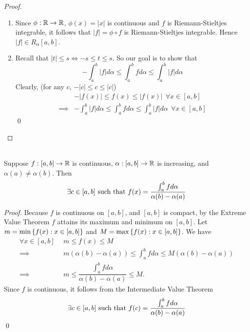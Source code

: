 \begin{proof}
    \begin{enumerate}
        \item Since $\phi: \mathbb{R} \to \mathbb{R}$, $\phi(x) = |x|$ is continuous and $f$ is Riemann-Stieltjes integrable, it follows that $|f| = \phi \circ f$ is Riemann-Stieltjes integrable. Hence $|f| \in R_\alpha[a,b]$.
        \item Recall that $|t| \leq s \iff -s \leq t \leq s$. So our goal is to show that 
        $$-\int_a^b |f| d\alpha \leq \int_a^b f d \alpha \leq \int_a^b |f| d\alpha$$
        Clearly, (for any $c$, $-|c| \leq c \leq |c|$)
        \begin{align*}
            &-|f(x)| \leq f(x) \leq |f(x)|~~ \forall x \in [a,b] \\
            \implies& -\int_a^b |f| d\alpha \leq \int_a^b f d\alpha \leq \int_a^b |f| d\alpha ~~\forall x \in [a,b]
        \end{align*}
        \qed
    \end{enumerate}
\end{proof}

\begin{theorem} \leavevmode \\
    \label{Thm6.14}
    Suppose $f: [a,b] \to \mathbb{R}$ is continuous, $\alpha: [a,b] \to \mathbb{R}$ is increasing, and $\alpha(a) \neq \alpha(b)$. Then
    $$\exists c \in [a,b] \text{ such that } f(x) = \dfrac{\int_a^bf d\alpha}{\alpha(b) - \alpha(a)}$$
\end{theorem}

\begin{proof}
    Because $f$ is continuous on $[a,b]$, and $[a,b]$ is compact, by the Extreme Value Theorem $f$ attains its maximum and minimum on $[a,b]$. Let $m = \min\left\{f(x) : x \in [a,b]\right\}$ and $M = \max \left\{f(x) : x \in [a,b]\right\}$. We have
    \begin{align*}
        \forall x \in [a,b] ~~&m \leq f(x) \leq M \\
        \implies &m(\alpha(b) - \alpha(a)) \leq \int_a^b f d\alpha \leq M(\alpha(b) - \alpha(a)) \\
        \implies &m \leq \dfrac{\int_a^b f d\alpha}{\alpha(b)-\alpha(a)} \leq M.
    \end{align*}
    Since $f$ is continuous, it follows from the Intermediate Value Theorem
    $$\exists c \in [a,b] \text{ such that } f(c) = \dfrac{\int_a^b f d\alpha}{\alpha(b)-\alpha(a)}$$
    \qed
\end{proof}

